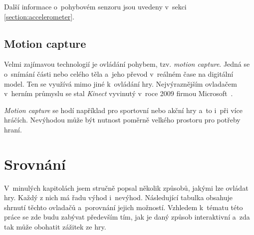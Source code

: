 \documentclass[thesis=B,czech,hidelinks]{FITthesis}[2012/06/26] %
\begin{document}
Další informace o~pohybovém senzoru jsou uvedeny v~sekci \ref{section:accelerometer}.

\subsection{Motion capture}
\label{section:motion_capture}

Velmi zajímavou technologií je ovládání pohybem, tzv. \textit{motion capture}. Jedná se o~snímání části nebo celého těla a~jeho převod v~reálném čase na digitální model. Ten se využívá mimo jiné k~ovládání hry. Nejvýraznějším ovladačem v~herním průmyslu se stal \textit{Kinect} vyvinutý v~roce 2009 firmou Microsoft~\cite{meetthekinect}.

\textit{Motion capture} se hodí například pro sportovní nebo akční hry a~to i~při více hráčích. Nevýhodou může být nutnost poměrně velkého prostoru pro potřeby hraní.

\section{Srovnání}

V~minulých kapitolách jsem stručně popsal několik způsobů, jakými lze ovládat hry. Každý z nich má řadu výhod i~nevýhod. Následující tabulka obsahuje shrnutí těchto ovladačů a~porovnání jejich možností. Vzhledem k~tématu této práce se zde budu zabývat především tím, jak je daný způsob interaktivní a~zda tak může obohatit zážitek ze hry.
\end{document}
